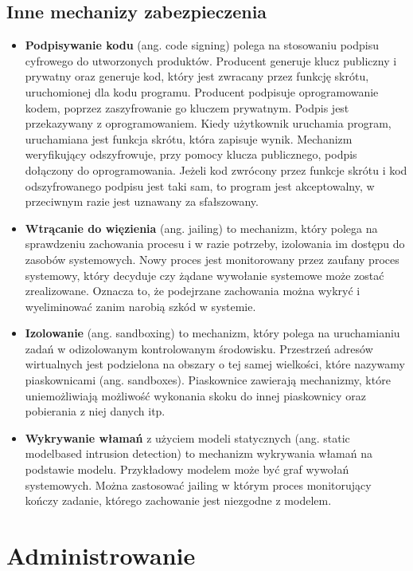 \documentclass{article}
\begin{document}
\subsection{Inne mechanizy zabezpieczenia}
\begin{itemize}
    \item \textbf{Podpisywanie kodu} (ang. code signing) polega na stosowaniu podpisu cyfrowego do utworzonych produktów. Producent generuje klucz publiczny i prywatny oraz generuje kod, który jest zwracany przez funkcję skrótu, uruchomionej dla kodu programu. Producent podpisuje oprogramowanie kodem, poprzez zaszyfrowanie go kluczem prywatnym. Podpis jest przekazywany z oprogramowaniem. Kiedy użytkownik uruchamia program, uruchamiana jest funkcja skrótu, która zapisuje wynik. Mechanizm weryfikujący odszyfrowuje, przy pomocy klucza publicznego, podpis dołączony do oprogramowania. Jeżeli kod zwrócony przez funkcje skrótu i kod odszyfrowanego podpisu jest taki sam, to program jest akceptowalny, w przeciwnym razie jest uznawany za sfałszowany.
    \item \textbf{Wtrącanie do więzienia} (ang. jailing) to mechanizm, który polega na sprawdzeniu zachowania procesu i w razie potrzeby, izolowania im dostępu do zasobów systemowych. Nowy proces jest monitorowany przez zaufany proces systemowy, który decyduje czy żądane wywołanie systemowe może zostać zrealizowane. Oznacza to, że podejrzane zachowania można wykryć i wyeliminować zanim narobią szkód w systemie.
    \item \textbf{Izolowanie} (ang. sandboxing) to mechanizm, który polega na uruchamianiu zadań w odizolowanym kontrolowanym środowisku. Przestrzeń adresów wirtualnych jest podzielona na obszary o tej samej wielkości, które nazywamy piaskownicami (ang. sandboxes). Piaskownice zawierają mechanizmy, które uniemożliwiają możliwość wykonania skoku do innej piaskownicy oraz pobierania z niej danych itp.
    \item \textbf{Wykrywanie włamań} z użyciem modeli statycznych (ang. static modelbased intrusion detection) to mechanizm wykrywania włamań na podstawie modelu. Przykładowy modelem może być graf wywołań systemowych. Można zastosować jailing w którym proces monitorujący kończy zadanie, którego zachowanie jest niezgodne z modelem.
\end{itemize}

\section{Administrowanie}
\end{document}
